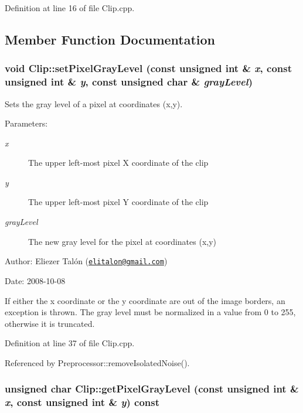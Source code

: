 Definition at line 16 of file Clip.cpp.

\subsection{Member Function Documentation}
\hypertarget{class_clip_454ff6070d0918e56a09a3f28ff430c3}{
\subsubsection[setPixelGrayLevel]{\setlength{\rightskip}{0pt plus 5cm}void Clip::setPixelGrayLevel (const unsigned int \& {\em x}, \/  const unsigned int \& {\em y}, \/  const unsigned char \& {\em grayLevel})}}
\label{class_clip_454ff6070d0918e56a09a3f28ff430c3}


Sets the gray level of a pixel at coordinates (x,y). 

\begin{Desc}
\item[Parameters:]
\begin{description}
\item[{\em x}]The upper left-most pixel X coordinate of the clip \item[{\em y}]The upper left-most pixel Y coordinate of the clip \item[{\em grayLevel}]The new gray level for the pixel at coordinates (x,y)\end{description}
\end{Desc}
\begin{Desc}
\item[Author:]Eliezer Talón (\href{mailto:elitalon@gmail.com}{\tt elitalon@gmail.com}) \end{Desc}
\begin{Desc}
\item[Date:]2008-10-08\end{Desc}
If either the x coordinate or the y coordinate are out of the image borders, an exception is thrown. The gray level must be normalized in a value from 0 to 255, otherwise it is truncated. 

Definition at line 37 of file Clip.cpp.

Referenced by Preprocessor::removeIsolatedNoise().\hypertarget{class_clip_334577b60ef51e42f977f952a29d1b66}{
\subsubsection[getPixelGrayLevel]{\setlength{\rightskip}{0pt plus 5cm}unsigned char Clip::getPixelGrayLevel (const unsigned int \& {\em x}, \/  const unsigned int \& {\em y}) const}}
\label{class_clip_334577b60ef51e42f977f952a29d1b66}


